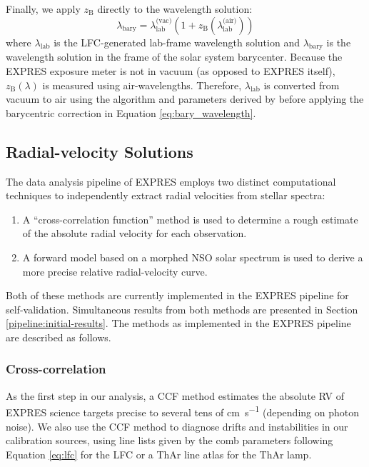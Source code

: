 Finally, we apply $z_\text{B}$ directly to the wavelength solution:
\begin{equation}
    \lambda_\text{bary} = \lambda_\text{lab}^\text{(vac)} \left(1 + z_\text{B}\left(\lambda_\text{lab}^\text{(air)}\right)\right)
    \label{eq:bary_wavelength}
\end{equation}
where $\lambda_\text{lab}$ is the LFC-generated lab-frame wavelength solution and $\lambda_\text{bary}$ is the wavelength solution in the frame of the solar system barycenter. Because the EXPRES exposure meter is not in vacuum (as opposed to EXPRES itself), $z_\text{B}(\lambda)$ is measured using air-wavelengths. Therefore, $\lambda_\text{lab}$ is converted from vacuum to air using the algorithm and parameters derived by \citet{ciddor_refractive_1996} before applying the barycentric correction in Equation \ref{eq:bary_wavelength}.

\subsection{Radial-velocity Solutions}
\label{pipeline:rv}

The data analysis pipeline of EXPRES employs two distinct computational techniques to independently extract radial velocities from stellar spectra:
\begin{enumerate}
    \item A ``cross-correlation function'' method \citep[CCF; see][]{baranne_coravel_1979} is used to determine a rough estimate of the absolute radial velocity for each observation.
    \item A forward model based on a morphed NSO solar spectrum is used to derive a more precise relative radial-velocity curve.
\end{enumerate}
Both of these methods are currently implemented in the EXPRES pipeline for self-vali\-dation. Simultaneous results from both methods are presented in Section \ref{pipeline:initial-results}. The methods as implemented in the EXPRES pipeline are described as follows.

\subsubsection{Cross-correlation}
\label{pipeline:ccf}

As the first step in our analysis, a CCF method estimates the absolute RV of EXPRES science targets precise to several tens of \si{\centi\meter\per\second} (depending on photon noise). We also use the CCF method to diagnose drifts and instabilities in our calibration sources, using line lists given by the comb parameters following Equation \ref{eq:lfc} for the LFC or a ThAr line atlas for the ThAr lamp.


